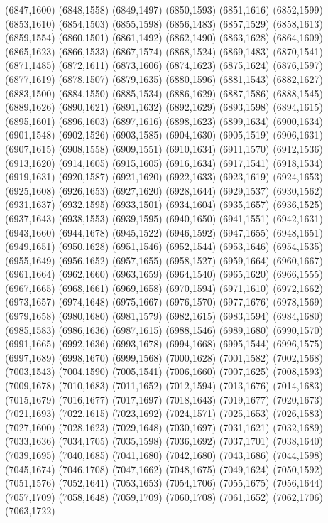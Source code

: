 (6847,1600)
(6848,1558)
(6849,1497)
(6850,1593)
(6851,1616)
(6852,1599)
(6853,1610)
(6854,1503)
(6855,1598)
(6856,1483)
(6857,1529)
(6858,1613)
(6859,1554)
(6860,1501)
(6861,1492)
(6862,1490)
(6863,1628)
(6864,1609)
(6865,1623)
(6866,1533)
(6867,1574)
(6868,1524)
(6869,1483)
(6870,1541)
(6871,1485)
(6872,1611)
(6873,1606)
(6874,1623)
(6875,1624)
(6876,1597)
(6877,1619)
(6878,1507)
(6879,1635)
(6880,1596)
(6881,1543)
(6882,1627)
(6883,1500)
(6884,1550)
(6885,1534)
(6886,1629)
(6887,1586)
(6888,1545)
(6889,1626)
(6890,1621)
(6891,1632)
(6892,1629)
(6893,1598)
(6894,1615)
(6895,1601)
(6896,1603)
(6897,1616)
(6898,1623)
(6899,1634)
(6900,1634)
(6901,1548)
(6902,1526)
(6903,1585)
(6904,1630)
(6905,1519)
(6906,1631)
(6907,1615)
(6908,1558)
(6909,1551)
(6910,1634)
(6911,1570)
(6912,1536)
(6913,1620)
(6914,1605)
(6915,1605)
(6916,1634)
(6917,1541)
(6918,1534)
(6919,1631)
(6920,1587)
(6921,1620)
(6922,1633)
(6923,1619)
(6924,1653)
(6925,1608)
(6926,1653)
(6927,1620)
(6928,1644)
(6929,1537)
(6930,1562)
(6931,1637)
(6932,1595)
(6933,1501)
(6934,1604)
(6935,1657)
(6936,1525)
(6937,1643)
(6938,1553)
(6939,1595)
(6940,1650)
(6941,1551)
(6942,1631)
(6943,1660)
(6944,1678)
(6945,1522)
(6946,1592)
(6947,1655)
(6948,1651)
(6949,1651)
(6950,1628)
(6951,1546)
(6952,1544)
(6953,1646)
(6954,1535)
(6955,1649)
(6956,1652)
(6957,1655)
(6958,1527)
(6959,1664)
(6960,1667)
(6961,1664)
(6962,1660)
(6963,1659)
(6964,1540)
(6965,1620)
(6966,1555)
(6967,1665)
(6968,1661)
(6969,1658)
(6970,1594)
(6971,1610)
(6972,1662)
(6973,1657)
(6974,1648)
(6975,1667)
(6976,1570)
(6977,1676)
(6978,1569)
(6979,1658)
(6980,1680)
(6981,1579)
(6982,1615)
(6983,1594)
(6984,1680)
(6985,1583)
(6986,1636)
(6987,1615)
(6988,1546)
(6989,1680)
(6990,1570)
(6991,1665)
(6992,1636)
(6993,1678)
(6994,1668)
(6995,1544)
(6996,1575)
(6997,1689)
(6998,1670)
(6999,1568)
(7000,1628)
(7001,1582)
(7002,1568)
(7003,1543)
(7004,1590)
(7005,1541)
(7006,1660)
(7007,1625)
(7008,1593)
(7009,1678)
(7010,1683)
(7011,1652)
(7012,1594)
(7013,1676)
(7014,1683)
(7015,1679)
(7016,1677)
(7017,1697)
(7018,1643)
(7019,1677)
(7020,1673)
(7021,1693)
(7022,1615)
(7023,1692)
(7024,1571)
(7025,1653)
(7026,1583)
(7027,1600)
(7028,1623)
(7029,1648)
(7030,1697)
(7031,1621)
(7032,1689)
(7033,1636)
(7034,1705)
(7035,1598)
(7036,1692)
(7037,1701)
(7038,1640)
(7039,1695)
(7040,1685)
(7041,1680)
(7042,1680)
(7043,1686)
(7044,1598)
(7045,1674)
(7046,1708)
(7047,1662)
(7048,1675)
(7049,1624)
(7050,1592)
(7051,1576)
(7052,1641)
(7053,1653)
(7054,1706)
(7055,1675)
(7056,1644)
(7057,1709)
(7058,1648)
(7059,1709)
(7060,1708)
(7061,1652)
(7062,1706)
(7063,1722)
